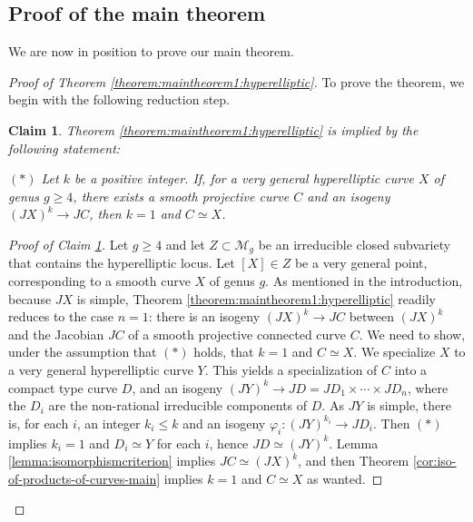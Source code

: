 \documentclass[a4paper,11pt,reqno]{amsart}
\numberwithin{equation}{section}
\theoremstyle{plain}
\newtheorem{claim}[theorem]{Claim}
\theoremstyle{definition}
\renewcommand{\cong}{\simeq}
\begin{document}
\subsection{Proof of the main theorem}

We are now in position to prove our main theorem. 

\begin{proof}[Proof of Theorem \ref{theorem:maintheorem1:hyperelliptic}] To prove the theorem, we begin with the following reduction step. 
\begin{claim} \label{claim:claim1}
    Theorem \ref{theorem:maintheorem1:hyperelliptic} is implied by the following statement:
    
    \vspace{2mm}
 \emph{   \hypertarget{star}{$(\ast)$} Let $k$ be a positive integer. 
 If, for a very general hyperelliptic curve $X$ of genus $g \geq 4$, there exists a smooth projective curve $C$ and an isogeny $(JX)^k \to JC$, then $k = 1$ and $C \cong X$.}
\end{claim}

\begin{proof}[Proof of Claim \ref{claim:claim1}]
Let $g\geq 4$ and let  $Z\subset \mathcal M_g$ be an irreducible closed subvariety that contains the hyperelliptic locus.
Let $[X]\in Z$ be a very general point, corresponding to a smooth curve $X$ of genus $g$. As mentioned in the introduction, because $JX$ is simple, Theorem \ref{theorem:maintheorem1:hyperelliptic} readily reduces to the case $n=1$: there is an isogeny $(JX)^k \to JC$ between $(JX)^k$ and the Jacobian $JC$ of a smooth projective connected curve $C$. We need to show, under the assumption that \hyperlink{star}{$(\ast)$} holds, that $k = 1$ and $C \cong X$. We specialize $X$ to a very general hyperelliptic curve $Y$. 
This yields a specialization of $C$ into a compact type curve $D$, and an isogeny $(JY)^k \to JD = JD_1 \times \cdots \times JD_n$, where the $D_i$ are the non-rational irreducible components of $D$. 
As $JY$ is simple, there is, for each $i$, an integer $k_i \leq k$ and an isogeny $\varphi_i \colon (JY)^{k_i} \to JD_i$. 
Then \hyperlink{star}{$(\ast)$} implies $k_i = 1$ and $D_i \cong Y$ for each $i$, hence $JD \cong (JY)^k$. Lemma \ref{lemma:isomorphismcriterion} implies $JC \cong (JX)^k$, and then Theorem \ref{cor:iso-of-products-of-curves-main} implies $k=1$ and $C \cong X$ as wanted. 
\end{proof}


\end{proof}
\end{document}
